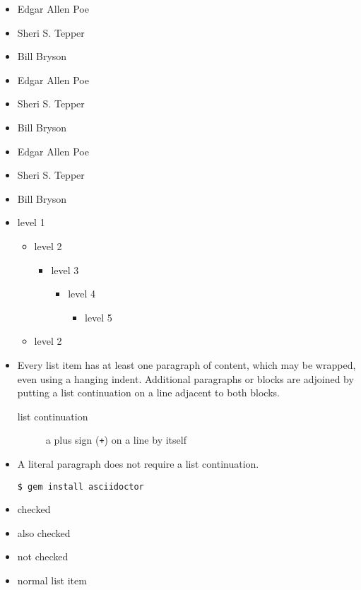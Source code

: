 \begin{itemize}
\item Edgar Allen Poe
\item Sheri S. Tepper
\item Bill Bryson
\end{itemize}

\begin{itemize}
\item Edgar Allen Poe
\item Sheri S. Tepper
\item Bill Bryson
\end{itemize}

\begin{itemize}
\item Edgar Allen Poe
\item Sheri S. Tepper
\item Bill Bryson
\end{itemize}

\begin{itemize}
\item level 1
\begin{itemize}
\item level 2
\begin{itemize}
\item level 3
\begin{itemize}
\item level 4
\begin{itemize}
\item level 5
\end{itemize}
\end{itemize}
\end{itemize}
\item level 2
\end{itemize}
\end{itemize}

\begin{itemize}
\item Every list item has at least one paragraph of content,
which may be wrapped, even using a hanging indent.
Additional paragraphs or blocks are adjoined by putting
a list continuation on a line adjacent to both blocks.
\begin{description}
\item[list continuation]a plus sign ({\tt +}) on a line by itself
\end{description}
\item A literal paragraph does not require a list continuation.
\begin{verbatim}
$ gem install asciidoctor
\end{verbatim}
\end{itemize}

\begin{itemize}
\item checked
\item also checked
\item not checked
\item normal list item
\end{itemize}
